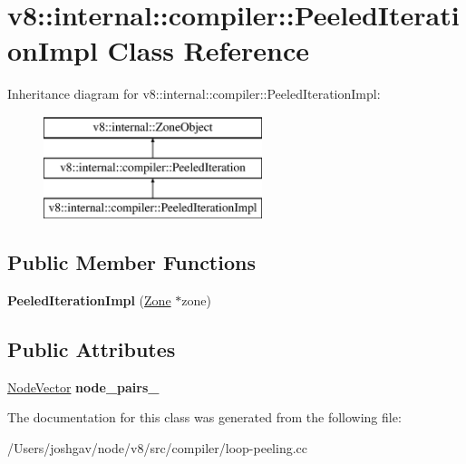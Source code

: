 \hypertarget{classv8_1_1internal_1_1compiler_1_1_peeled_iteration_impl}{}\section{v8\+:\+:internal\+:\+:compiler\+:\+:Peeled\+Iteration\+Impl Class Reference}
\label{classv8_1_1internal_1_1compiler_1_1_peeled_iteration_impl}
Inheritance diagram for v8\+:\+:internal\+:\+:compiler\+:\+:Peeled\+Iteration\+Impl\+:\begin{figure}[H]
\begin{center}
\leavevmode
\includegraphics[height=3.000000cm]{classv8_1_1internal_1_1compiler_1_1_peeled_iteration_impl}
\end{center}
\end{figure}
\subsection*{Public Member Functions}
\begin{DoxyCompactItemize}
\item 
{\bfseries Peeled\+Iteration\+Impl} (\hyperlink{classv8_1_1internal_1_1_zone}{Zone} $\ast$zone)\hypertarget{classv8_1_1internal_1_1compiler_1_1_peeled_iteration_impl_a66146e341c3bc048a242746bd6af9848}{}\label{classv8_1_1internal_1_1compiler_1_1_peeled_iteration_impl_a66146e341c3bc048a242746bd6af9848}

\end{DoxyCompactItemize}
\subsection*{Public Attributes}
\begin{DoxyCompactItemize}
\item 
\hyperlink{classv8_1_1internal_1_1_zone_vector}{Node\+Vector} {\bfseries node\+\_\+pairs\+\_\+}\hypertarget{classv8_1_1internal_1_1compiler_1_1_peeled_iteration_impl_a7e04007a052302eea373c4eedf91a93d}{}\label{classv8_1_1internal_1_1compiler_1_1_peeled_iteration_impl_a7e04007a052302eea373c4eedf91a93d}

\end{DoxyCompactItemize}


The documentation for this class was generated from the following file\+:\begin{DoxyCompactItemize}
\item 
/\+Users/joshgav/node/v8/src/compiler/loop-\/peeling.\+cc\end{DoxyCompactItemize}
